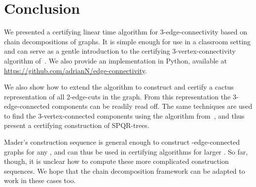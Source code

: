 \documentclass[paper=a4]{scrartcl}
\begin{document}
\section{Conclusion}\label{Conclusion}
We presented a certifying linear time algorithm for 3-edge-connectivity based
on chain decompositions of graphs. It is simple enough for use in a classroom setting and can serve as a gentle introduction to the certifying 3-vertex-connectivity algorithm of~\cite{Schmidt2013}. We also provide an implementation in Python, available at \url{https://github.com/adrianN/edge-connectivity}.

We also show how to extend the algorithm to construct and certify a cactus representation of all 2-edge-cuts in the graph. From this representation the 3-edge-connected components can be readily read off. The same techniques are used to find the 3-vertex-connected components using the algorithm from~\cite{Schmidt2013}, and thus present a certifying construction of SPQR-trees.

Mader's construction sequence is general enough to construct -edge-connected graphs for any , and can thus be used in certifying algorithms for larger . So far, though, it is unclear how to compute these more complicated construction sequences. We hope that the chain decomposition framework can be adapted to work in these cases too.
\end{document}
